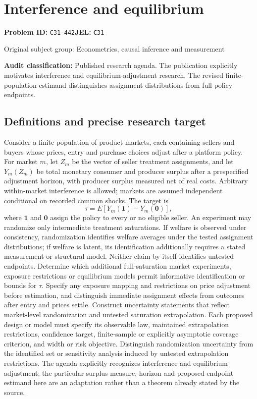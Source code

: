 \documentclass[11pt,a4paper]{article}
\begin{document}
\section*{Interference and equilibrium}
\textbf{Problem ID:} \texttt{C31-442}\quad \textbf{JEL:} \texttt{C31}\par
\label{problem:OP-0421}
{\sffamily\small\color{muted}Original subject group: Econometrics, causal inference and measurement\par}
\label{definitions:problem:30007703}
\textbf{Audit classification:} Published research agenda. The publication explicitly motivates interference and equilibrium-adjustment research. The revised finite-population estimand distinguishes assignment distributions from full-policy endpoints.
\subsection*{Definitions and precise research target}
Consider a finite population of product markets, each containing sellers and buyers whose prices, entry and purchase choices adjust after a platform policy. For market \(m\), let \(Z_m\) be the vector of seller treatment assignments, and let \(Y_m(Z_m)\) be total monetary consumer and producer surplus after a prespecified adjustment horizon, with producer surplus measured net of real costs. Arbitrary within-market interference is allowed; markets are assumed independent conditional on recorded common shocks. The target is
\[
\tau=E[Y_m(\mathbf1)-Y_m(\mathbf0)],
\]
where \(\mathbf1\) and \(\mathbf0\) assign the policy to every or no eligible seller. An experiment may randomize only intermediate treatment saturations. If welfare is observed under consistency, randomization identifies welfare averages under the tested assignment distributions; if welfare is latent, its identification additionally requires a stated measurement or structural model. Neither claim by itself identifies untested endpoints. Determine which additional full-saturation market experiments, exposure restrictions or equilibrium models permit informative identification or bounds for \(\tau\). Specify any exposure mapping and restrictions on price adjustment before estimation, and distinguish immediate assignment effects from outcomes after entry and prices settle. Construct uncertainty statements that reflect market-level randomization and untested saturation extrapolation. Each proposed design or model must specify its observable law, maintained extrapolation restrictions, confidence target, finite-sample or explicitly asymptotic coverage criterion, and width or risk objective. Distinguish randomization uncertainty from the identified set or sensitivity analysis induced by untested extrapolation restrictions. The agenda explicitly recognizes interference and equilibrium adjustment; the particular surplus measure, horizon and proposed endpoint estimand here are an adaptation rather than a theorem already stated by the source.
\end{document}
